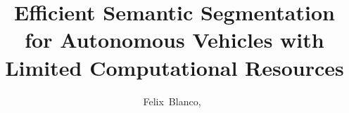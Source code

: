 \title{\LARGE Efficient Semantic Segmentation for Autonomous
Vehicles with Limited Computational Resources \\
}

\author{
  Felix~Blanco,~
}



\maketitle
